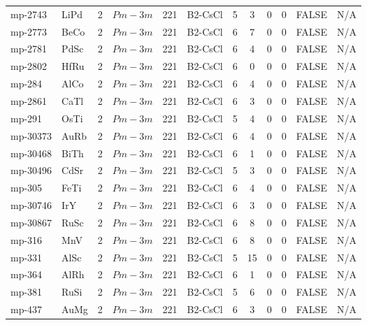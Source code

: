 {\begin{longtable}{llcccccccccc}
    mp-2743 & LiPd  & 2     & $Pm-3m$ & 221   & B2-CsCl & 5     & 3     & 0     & 0     & FALSE & N/A \\
    mp-2773 & BeCo  & 2     & $Pm-3m$ & 221   & B2-CsCl & 6     & 7     & 0     & 0     & FALSE & N/A \\
    mp-2781 & PdSc  & 2     & $Pm-3m$ & 221   & B2-CsCl & 6     & 4     & 0     & 0     & FALSE & N/A \\
    mp-2802 & HfRu  & 2     & $Pm-3m$ & 221   & B2-CsCl & 6     & 0     & 0     & 0     & FALSE & N/A \\
    mp-284 & AlCo  & 2     & $Pm-3m$ & 221   & B2-CsCl & 6     & 4     & 0     & 0     & FALSE & N/A \\
    mp-2861 & CaTl  & 2     & $Pm-3m$ & 221   & B2-CsCl & 6     & 3     & 0     & 0     & FALSE & N/A \\
    mp-291 & OsTi  & 2     & $Pm-3m$ & 221   & B2-CsCl & 5     & 4     & 0     & 0     & FALSE & N/A \\
    mp-30373 & AuRb  & 2     & $Pm-3m$ & 221   & B2-CsCl & 6     & 4     & 0     & 0     & FALSE & N/A \\
    mp-30468 & BiTh  & 2     & $Pm-3m$ & 221   & B2-CsCl & 6     & 1     & 0     & 0     & FALSE & N/A \\
    mp-30496 & CdSr  & 2     & $Pm-3m$ & 221   & B2-CsCl & 5     & 3     & 0     & 0     & FALSE & N/A \\
    mp-305 & FeTi  & 2     & $Pm-3m$ & 221   & B2-CsCl & 6     & 4     & 0     & 0     & FALSE & N/A \\
    mp-30746 & IrY   & 2     & $Pm-3m$ & 221   & B2-CsCl & 6     & 3     & 0     & 0     & FALSE & N/A \\
    mp-30867 & RuSc  & 2     & $Pm-3m$ & 221   & B2-CsCl & 6     & 8     & 0     & 0     & FALSE & N/A \\
    mp-316 & MnV   & 2     & $Pm-3m$ & 221   & B2-CsCl & 6     & 8     & 0     & 0     & FALSE & N/A \\
    mp-331 & AlSc  & 2     & $Pm-3m$ & 221   & B2-CsCl & 5     & 15    & 0     & 0     & FALSE & N/A \\
    mp-364 & AlRh  & 2     & $Pm-3m$ & 221   & B2-CsCl & 6     & 1     & 0     & 0     & FALSE & N/A \\
    mp-381 & RuSi  & 2     & $Pm-3m$ & 221   & B2-CsCl & 5     & 6     & 0     & 0     & FALSE & N/A \\
    mp-437 & AuMg  & 2     & $Pm-3m$ & 221   & B2-CsCl & 6     & 3     & 0     & 0     & FALSE & N/A \\

\end{longtable}}
